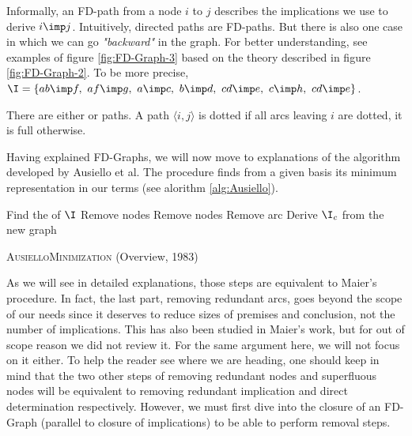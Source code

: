 \noindent Informally, an FD-path from a node $i$ to $j$ describes the 
implications we use to derive $i \imp j$. Intuitively, 
directed paths are FD-paths. But there is also one case in which
we can go \textit{"backward"} in the graph. For better understanding, see examples of figure \ref{fig:FD-Graph-3} based on the theory described in figure 
\ref{fig:FD-Graph-2}. To be more precise, $\I = \{ ab \imp f, \ af \imp g,
\ a \imp c, \ b \imp d, \ cd \imp e, \ c \imp h, \ cd \imp e \}$.

\begin{figure}[ht]
	
\end{figure}

There are either  or  paths. A path $\langle i, j
\rangle$ is dotted if all arcs leaving $i$ are dotted, it is full otherwise.

\begin{figure}[ht]
	
\end{figure}

\vspace{1.2em}

Having explained FD-Graphs, we will now move to explanations of the algorithm
developed by Ausiello et al. The procedure finds from a given basis 
its minimum representation in our terms (see alorithm \ref{alg:Ausiello}).

\vspace{1.2em}

\begin{algorithm}[H]
	
	\BlankLine
	\BlankLine
	
	Find the  of $\I$ \;
	Remove  nodes \;
	Remove  nodes \;
	Remove  arc \;
	Derive $\I_c$ from the new graph \;
	
	\caption{\textsc{AusielloMinimization} (Overview, 1983)}
	\label{alg:Ausiello}
\end{algorithm}

\vspace{1.2em}

As we will see in detailed explanations, those steps are equivalent to Maier's
procedure. In fact, the last part, removing redundant arcs, goes beyond the 
scope of our needs since it deserves to reduce sizes of premises and 
conclusion, not the number of implications. This has also been studied in 
Maier's work, but for out of scope reason we did not review it. For the same
argument here, we will not focus on it either. To help the reader see where we 
are heading, one should keep in mind that the two other steps of removing 
redundant nodes and superfluous nodes will be equivalent to removing redundant 
implication and direct determination respectively. However, we must first
dive into the closure of an FD-Graph (parallel to closure of implications) to
be able to perform removal steps.

